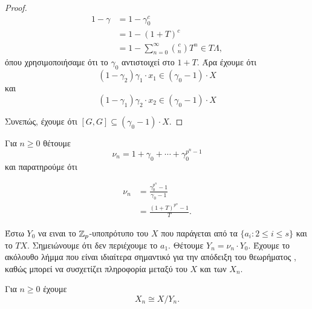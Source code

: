 \begin{proof}
    \begin{align*}
        1-\gamma & = 1 - \gamma_0^c \\ 
        &= 1- (1+T)^c \\
        &= 1 - \sum\limits_{n=0}^\infty \binom{c}{n}T^n \in T\Lambda ,
    \end{align*} όπου χρησιμοποιήσαμε ότι το $\gamma_0$ αντιστοιχεί στο $1+T$. Άρα έχουμε ότι
    $$(1-\gamma_2) \gamma_1 \cdot x_1 \in (\gamma_0-1) \cdot X$$ και $$(1-\gamma_1)\gamma_2 \cdot x_2 \in (\gamma_0-1)\cdot X$$

    \noindent Συνεπώς, έχουμε ότι $[G,G] \subseteq (\gamma_0 -1)\cdot X$.
\end{proof}


\noindent Για $n\geq 0$ θέτουμε 
$$ \nu_n = 1 + \gamma_0 + \cdots + \gamma_0^{p^n-1}$$ και παρατηρούμε ότι 


\begin{align*}
    \nu_n &= \frac{\gamma_0^{p^n}-1}{\gamma_0 -1 } \\
    &= \frac{(1+T)^{p^n}-1}{T}.
\end{align*}

\noindent Έστω $Y_0$ να ειναι το $\mathbb{Z}_p$-υποπρότυπο του $X$ που παράγεται από τα $\{a_i: 2 \leq i \leq s\}$ και το $TX$. Σημειώνουμε ότι δεν περιέχουμε το $a_1$. Θέτουμε $Y_n = \nu_n \cdot Y_0$. Έχουμε το ακόλουθο λήμμα που είναι ιδιαίτερα σημαντικό για την απόδειξη του θεωρήματος , καθώς μπορεί να συσχετίζει πληροφορία μεταξύ του $X$ και των $X_n$.

\begin{lemma}\label{lemma4.22}
    Για $n\geq 0$ έχουμε
    $$X_n \cong X/Y_n.$$
\end{lemma}

